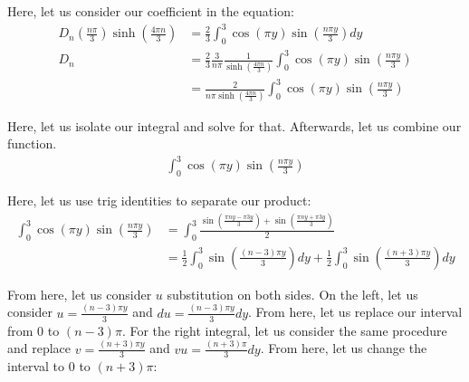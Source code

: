 \documentclass{article}
\begin{document}
\begin{enumerate}
\begin{enumerate}
    Here, let us consider our coefficient in the equation:
    \begin{align}
      D_n \left(\frac{n \pi}{3}\right) \sinh\left(\frac{4 \pi n}{3}\right)
      & = \frac{2}{3} \int^3_0 \cos(\pi y) \sin\left(\frac{n \pi y}{3}\right) dy\\
      D_n & =
      \frac{2}{3}
      \frac{3}{n \pi}
      \frac{1}{\sinh\left(\frac{4 \pi n}{3}\right)}
      \int^3_0 \cos(\pi y) \sin\left(\frac{n \pi y}{3}\right)\\
      & =
      \frac{2}{n \pi \sinh\left(\frac{4 \pi n}{3}\right)}
      \int^3_0 \cos(\pi y) \sin\left(\frac{n \pi y}{3}\right)
    \end{align}

    Here, let us isolate our integral and solve for that. Afterwards, let us combine our function.
    \begin{align}
      \int^3_0 \cos(\pi y) \sin\left(\frac{n \pi y}{3}\right)
    \end{align}

    Here, let us use trig identities to separate our product:
    \begin{align}
      \int^3_0
      \cos(\pi y) \sin\left(\frac{n \pi y}{3}\right)
      & =
      \int^3_0
      \frac
      {\sin\left(\frac{\pi n y - \pi 3 y}{3}\right) +
      \sin\left( \frac{\pi n y + \pi 3 y}{3} \right)}
      {2}\\
      & =
      \frac{1}{2}
      \int^3_0
      \sin\left(\frac{(n - 3)\pi y}{3}\right) dy +
      \frac{1}{2}
      \int^3_0
      \sin\left( \frac{(n + 3)\pi y}{3} \right) dy
    \end{align}

    From here, let us consider $u$ substitution on both sides. On the left, let us consider $u = \frac{(n - 3)\pi y}{3}$ and $du = \frac{(n - 3) \pi y}{3} dy$. From here, let us replace our interval from $0$ to $(n - 3) \pi$. For the right integral, let us consider the same procedure and replace $v = \frac{(n + 3) \pi y}{3}$ and $vu = \frac{(n + 3) \pi}{3} dy$. From here, let us change the interval to $0$ to $(n + 3)\pi$:


\end{enumerate}
\end{enumerate}
\end{document}
